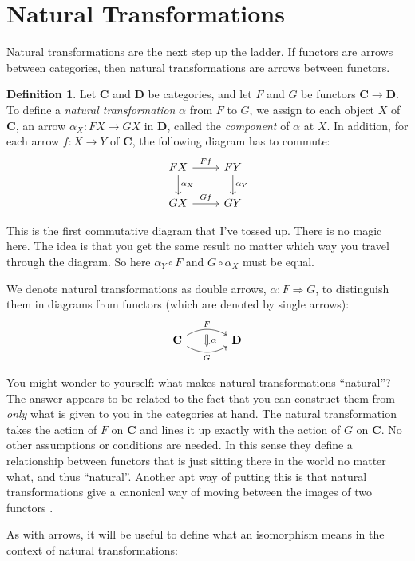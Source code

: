 \documentclass[12pt]{article}
\theoremstyle{definition}
\theoremstyle{definition}
\newtheorem{defn}{Definition}[]
\theoremstyle{definition}
\numberwithin{equation}{section}
\newcommand{\cat}[1]{\mathbf{#1}}      %
\newcommand{\CC}{\cat{C}}
\newcommand{\DD}{\cat{D}}
\newcommand{\fto}{\Rightarrow}
\def\ni{\goodbreak\noindent}
\begin{document}
\section{Natural Transformations}

Natural transformations are the next step up the ladder. If functors are arrows between
categories, then natural transformations are arrows between functors.
\begin{defn}
Let $\CC$ and $\DD$ be categories, and let $F$ and $G$ be functors $\CC \to \DD$. To
define a \emph{natural transformation} $\alpha$ from $F$ to $G$, we assign to each object
$X$ of $\CC$, an arrow $\alpha_X:FX\to GX$ in $\DD$, called the \emph{component} of
$\alpha$ at $X$. In addition, for each arrow $f:X\to Y$ of $\CC$, the following diagram
has to commute:
  $$
  \begin{tikzcd}
   FX \ar{r}{Ff} \ar{d}{\alpha_X} & FY \ar{d}{\alpha_{Y}} \\
   GX \ar{r}{Gf} & GY
  \end{tikzcd}
  $$
\end{defn}
\ni
This is the first commutative diagram that I've tossed up. There is no magic here. The
idea is that you get the same result no matter which way you travel through the diagram.
So here $\alpha_Y \circ F$ and $G \circ \alpha_X$ must be equal.

We denote natural transformations as double arrows, $\alpha: F \fto G$, to distinguish
them in diagrams from functors (which are denoted by single arrows):
 $$
 \begin{tikzcd}[column sep=large]
  \CC \ar[bend left,""{below,name=F}]{r}{F} \ar[bend right,""{above,name=G}]{r}[swap]{G} & \DD
  \ar[Rightarrow,from=F,to=G,"\,\alpha"]
 \end{tikzcd}
 $$

You might wonder to yourself: what makes natural transformations ``natural''? The answer
appears to be related to the fact that you can construct them from {\it only} what is
given to you in the categories at hand. The natural transformation takes the action of $F$
on $\CC$ and lines it up exactly with the action of $G$ on $\CC$. No other assumptions or
conditions are needed. In this sense they define a relationship between functors that is
just sitting there in the world no matter what, and thus ``natural''. Another apt way of
putting this is that natural transformations give a canonical way of moving between the
images of two functors \cite{Goedecke}.

As with arrows, it will be useful to define what an isomorphism means in the context of
natural transformations:
\end{document}
